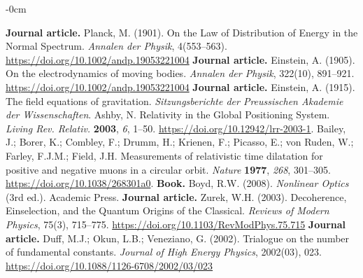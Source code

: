 \documentclass[entropy,article,submit,pdftex,moreauthors]{Definitions/mdpi}
\begin{document}
\begin{adjustwidth}{-\extralength}{0cm}
{\begin{thebibliography}{999}
\textbf{Journal article.} Planck, M. (1901). On the Law of Distribution of Energy in the Normal Spectrum. \textit{Annalen der Physik}, 4(553–563). \url{https://doi.org/10.1002/andp.19053221004}
\textbf{Journal article.} Einstein, A. (1905). On the electrodynamics of moving bodies. \textit{Annalen der Physik}, 322(10), 891–921. \url{https://doi.org/10.1002/andp.19053221004}
\textbf{Journal article.} Einstein, A. (1915). The field equations of gravitation. \textit{Sitzungsberichte der Preussischen Akademie der Wissenschaften}.
Ashby, N. Relativity in the Global Positioning System. {\em Living Rev. Relativ.} {\bf 2003}, {\em 6}, 1--50. \url{https://doi.org/10.12942/lrr-2003-1}.
Bailey, J.; Borer, K.; Combley, F.; Drumm, H.; Krienen, F.; Picasso, E.; von Ruden, W.; Farley, F.J.M.; Field, J.H. Measurements of relativistic time dilatation for positive and negative muons in a circular orbit. {\em Nature} {\bf 1977}, {\em 268}, 301--305. \url{https://doi.org/10.1038/268301a0}.
\textbf{Book.} Boyd, R.W. (2008). \textit{Nonlinear Optics} (3rd ed.). Academic Press.
\textbf{Journal article.} Zurek, W.H. (2003). Decoherence, Einselection, and the Quantum Origins of the Classical. \textit{Reviews of Modern Physics}, 75(3), 715–775. \url{https://doi.org/10.1103/RevModPhys.75.715}
\textbf{Journal article.} Duff, M.J.; Okun, L.B.; Veneziano, G. (2002). Trialogue on the number of fundamental constants. \textit{Journal of High Energy Physics}, 2002(03), 023. \url{https://doi.org/10.1088/1126-6708/2002/03/023}


\end{thebibliography}
}


\end{adjustwidth}
\end{document}

